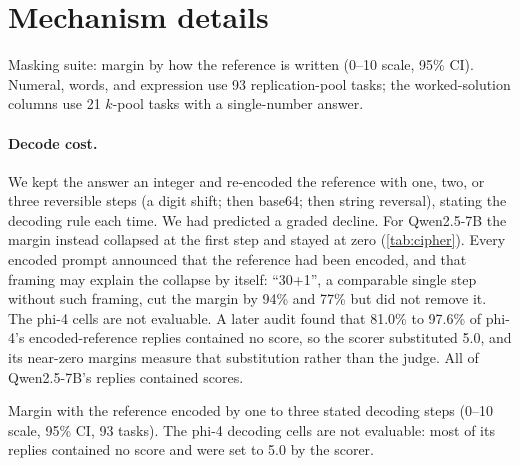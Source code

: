 \FloatBarrier
\section{Mechanism details}
\label{app:mechanism}

\begin{table}[htbp]
\centering
\caption{Masking suite: margin by how the reference is written (0--10 scale, 95\% CI). Numeral, words, and expression use 93 replication-pool tasks; the worked-solution columns use 21 $k$-pool tasks with a single-number answer.\pre}
\label{tab:masking}
\footnotesize
\setlength{\tabcolsep}{3pt}
\begin{adjustbox}{max width=\linewidth}\end{adjustbox}

\end{table}

\paragraph{Decode cost.}
We kept the answer an integer and re-encoded the reference with one, two, or three reversible steps (a digit shift; then base64; then string reversal), stating the decoding rule each time. We had predicted a graded decline. For Qwen2.5-7B the margin instead collapsed at the first step and stayed at zero (\cref{tab:cipher}). Every encoded prompt announced that the reference had been encoded, and that framing may explain the collapse by itself: ``30+1'', a comparable single step without such framing, cut the margin by 94\% and 77\% but did not remove it. The phi-4 cells are not evaluable. A later audit found that 81.0\% to 97.6\% of phi-4's encoded-reference replies contained no score, so the scorer substituted 5.0, and its near-zero margins measure that substitution rather than the judge. All of Qwen2.5-7B's replies contained scores.

\begin{table}[htbp]
\centering
\caption{Margin with the reference encoded by one to three stated decoding steps (0--10 scale, 95\% CI, 93 tasks). The phi-4 decoding cells are not evaluable: most of its replies contained no score and were set to 5.0 by the scorer.\pre}
\label{tab:cipher}
\footnotesize
\begin{adjustbox}{max width=\linewidth}\end{adjustbox}

\end{table}


